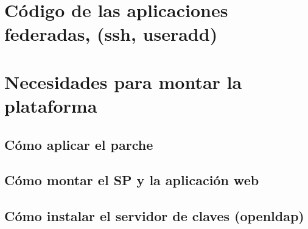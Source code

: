     \section{Código de las aplicaciones federadas, (ssh, useradd)}
    \section{Necesidades para montar la plataforma}
        \subsection{Cómo aplicar el parche}
        \subsection{Cómo montar el SP y la aplicación web}
        \subsection{Cómo instalar el servidor de claves (openldap)}
